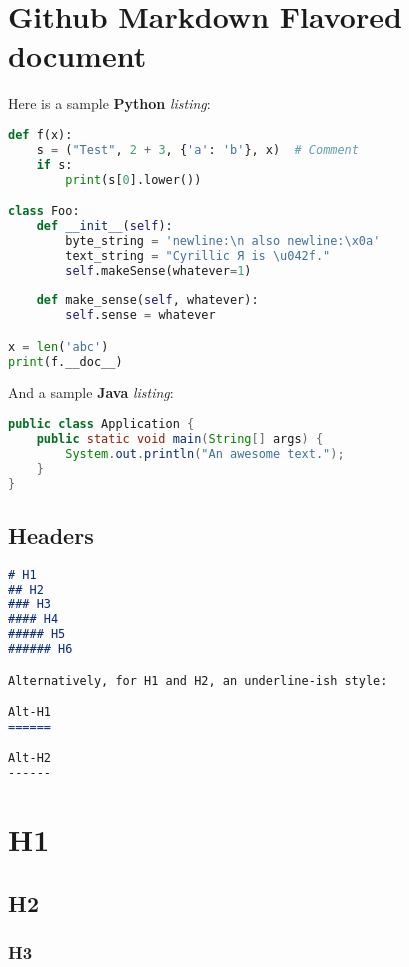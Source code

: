 \documentclass[a4paper, 11pt]{gfm}
\begin{document}
\section{Github Markdown Flavored document}

Here is a sample {\bf Python} {\it listing}:

\begin{lstlisting}[language=Python]
def f(x):
	s = ("Test", 2 + 3, {'a': 'b'}, x)  # Comment
	if s:
		print(s[0].lower())

class Foo:
	def __init__(self):
		byte_string = 'newline:\n also newline:\x0a'
		text_string = "Cyrillic Я is \u042f."
		self.makeSense(whatever=1)
	
	def make_sense(self, whatever):
		self.sense = whatever

x = len('abc')
print(f.__doc__)
\end{lstlisting}

And a sample {\bf Java} {\it listing}:

\begin{lstlisting}[language=Java]
public class Application {
    public static void main(String[] args) {
        System.out.println("An awesome text.");
    }
}
\end{lstlisting}

\subsection{Headers}

\begin{lstlisting}[language=Markdown]
# H1
## H2
### H3
#### H4
##### H5
###### H6

Alternatively, for H1 and H2, an underline-ish style:

Alt-H1
======

Alt-H2
------
\end{lstlisting}

\section{H1}

\subsection{H2}

\subsubsection{H3}
\end{document}
